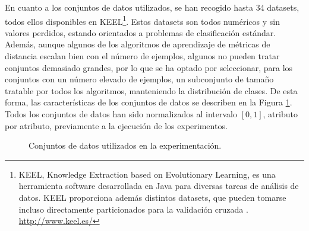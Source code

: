 En cuanto a los conjuntos de datos utilizados, se han recogido hasta 34 datasets, todos ellos disponibles en KEEL\footnote{KEEL, Knowledge Extraction based on Evolutionary Learning, es una herramienta software desarrollada en Java para diversas tareas de análisis de datos. KEEL proporciona además distintos datasets, que pueden tomarse incluso directamente particionados para la validación cruzada \cite{keel}. \url{http://www.keel.es/}}. Estos datasets son todos numéricos y sin valores perdidos, estando orientados a problemas de clasificación estándar. Además, aunque algunos de los algoritmos de aprendizaje de métricas de distancia escalan bien con el número de ejemplos, algunos no pueden tratar conjuntos demasiado grandes, por lo que se ha optado por seleccionar, para los conjuntos con un número elevado de ejemplos, un subconjunto de tamaño tratable por todos los algoritmos, manteniendo la distribución de clases. De esta forma, las características de los conjuntos de datos se describen en la Figura \ref{fig:exp:datasets}. Todos los conjuntos de datos han sido normalizados al intervalo $[0,1]$, atributo por atributo, previamente a la ejecución de los experimentos.

\begin{figure}[h]
\centering
\resizebox{0.7\textwidth}{!}{%
    
}
\caption{Conjuntos de datos utilizados en la experimentación.} \label{fig:exp:datasets}
\end{figure}


